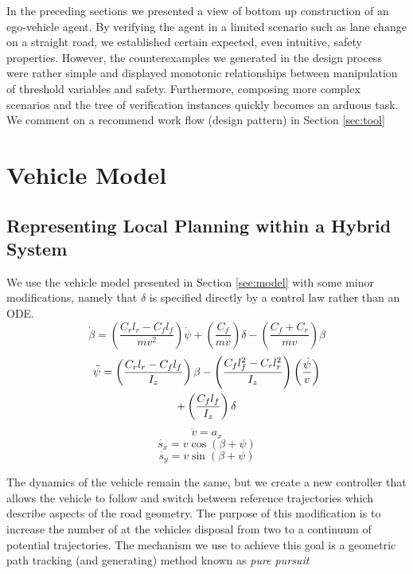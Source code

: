 In the preceding sections we presented a view of bottom up construction of an ego-vehicle agent. By verifying the agent in a limited scenario such as lane change on a straight road, we established certain expected, even intuitive, safety properties. However, the counterexamples we generated in the design process were rather simple and displayed monotonic relationships between manipulation of threshold variables and safety. Furthermore, composing more complex scenarios and the tree of verification instances quickly becomes an arduous task. We comment on a recommend work flow (design pattern) in Section \ref{sec:tool}

\section{Vehicle Model}
\subsection{Representing Local Planning within a Hybrid System}
We use the vehicle model presented in Section \ref{sec:model} with some minor modifications, namely that $\delta$ is specified directly by a control law rather than an ODE. 
\begin{equation}
\label{eqn:beta}
\dot{\beta}=\left(\frac{C_rl_r-C_fl_f}{mv^2} \right)\dot{\psi}+\left(\frac{C_f}{mv} \right)\delta-\left(\frac{C_f+C_r}{mv} \right)\beta
\end{equation}
\begin{gather}
\label{eqn:psi}
\ddot{\psi}=\left(\frac{C_rl_r-C_fl_f}{I_z} \right)\beta-\left(\frac{C_fl_f^2-C_rl_r^2}{I_z} \right)\left(\frac{\dot{\psi}}{v} \right) \notag \\
+\left(\frac{C_fl_f}{I_z} \right)\delta
\end{gather}
\begin{equation}
\label{eqn:v}
\dot{v}=a_x
\end{equation}
\begin{equation}
\label{eqn:sx}
\dot{s_x}=v\cos{(\beta+\psi)}
\end{equation}
\begin{equation}
\label{eqn:sy}
\dot{s_y}=v\sin{(\beta+\psi)}	
\end{equation}	


The dynamics of the vehicle remain the same, but we create a new controller that allows the vehicle to follow and switch between reference trajectories which describe aspects of the road geometry. The purpose of this modification is to increase the number of  at the vehicles disposal from two to a continuum of potential trajectories. The mechanism we use to achieve this goal is a geometric path tracking (and generating) method known as \emph{pure pursuit}
